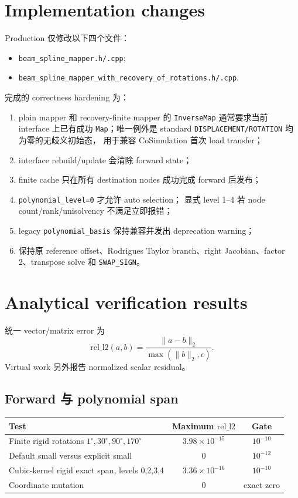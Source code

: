 \documentclass[11pt,a4paper]{article}
\newcommand{\relLtwo}{\mathrm{rel\_l2}}
\begin{document}
\section{Implementation changes}

Production 仅修改以下四个文件：
\begin{itemize}
  \item \texttt{beam\_spline\_mapper.h/.cpp};
  \item
  \texttt{beam\_spline\_mapper\_with\_recovery\_of\_rotations.h/.cpp}.
\end{itemize}

完成的 correctness hardening 为：
\begin{enumerate}
  \item plain mapper 和 recovery-finite mapper 的
        \texttt{InverseMap} 通常要求当前 interface 上已有成功
        \texttt{Map}；唯一例外是 standard
        \texttt{DISPLACEMENT/ROTATION} 均为零的无歧义初始态，
        用于兼容 CoSimulation 首次 load transfer；
  \item interface rebuild/update 会清除 forward state；
  \item finite cache 只在所有 destination nodes 成功完成 forward 后发布；
  \item \texttt{polynomial\_level=0} 才允许 auto selection；
        显式 level 1--4 若 node count/rank/unisolvency 不满足立即报错；
  \item legacy \texttt{polynomial\_basis} 保持兼容并发出
        deprecation warning；
  \item 保持原 reference offset、Rodrigues Taylor branch、right
        Jacobian、factor 2、transpose solve 和 \texttt{SWAP\_SIGN}。
\end{enumerate}

\section{Analytical verification results}

统一 vector/matrix error 为
\[
 \relLtwo(a,b)
 =\frac{\|a-b\|_2}{\max(\|b\|_2,\epsilon)}.
\]
Virtual work 另外报告 normalized scalar residual。

\subsection{Forward 与 polynomial span}

\begin{center}
\begin{tabular}{lcc}
\toprule
Test & Maximum $\relLtwo$ & Gate\\
\midrule
Finite rigid rotations $1^\circ,30^\circ,90^\circ,170^\circ$
  & $3.98\times10^{-15}$ & $10^{-10}$\\
Default small versus explicit small & $0$ & $10^{-12}$\\
Cubic-kernel rigid exact span, levels 0,2,3,4
  & $3.36\times10^{-16}$ & $10^{-10}$\\
Coordinate mutation & $0$ & exact zero\\
\bottomrule
\end{tabular}
\end{center}
\end{document}
